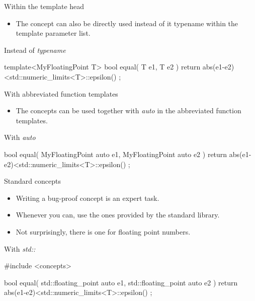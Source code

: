 \begin{frame}[fragile]
    \begin{block}{Within the template head}
      \begin{itemize}
        \item The concept can also be directly used instead of {it typename} within the template parameter list.
      \end{itemize}
    \end{block}
    \begin{exampleblock}{Instead of {\it typename}}
      \scriptsize
      \begin{cppcode*}{}
      template<MyFloatingPoint T>
      bool equal( T e1, T e2 )
      { return abs(e1-e2)<std::numeric_limits<T>::epsilon() ; }
      \end{cppcode*}
    \end{exampleblock}
\end{frame}

\begin{frame}[fragile]
    \begin{block}{With abbreviated function templates}
      \begin{itemize}
        \item The concepts can be used together with {\it auto} in the abbreviated function templates.
      \end{itemize}
    \end{block}
    \begin{exampleblock}{With {\it auto}}
      \scriptsize
      \begin{cppcode*}{}
      bool equal( MyFloatingPoint auto e1, MyFloatingPoint auto e2 )
      { return abs(e1-e2)<std::numeric_limits<T>::epsilon() ; }
      \end{cppcode*}
    \end{exampleblock}
\end{frame}

\begin{frame}[fragile]
    \begin{block}{Standard concepts}
      \begin{itemize}
        \item Writing a bug-proof concept is an expert task.
        \item Whenever you can, use the ones provided by the standard library.
        \item Not surprisingly, there is one for floating point numbers.
      \end{itemize}
    \end{block}
    \begin{exampleblock}{With {\it std::}}
      \scriptsize
      \begin{cppcode*}{}
      #include <concepts>

      bool equal( std::floating_point auto e1, std::floating_point auto e2 )
      { return abs(e1-e2)<std::numeric_limits<T>::epsilon() ; }
      \end{cppcode*}
    \end{exampleblock}
\end{frame}


